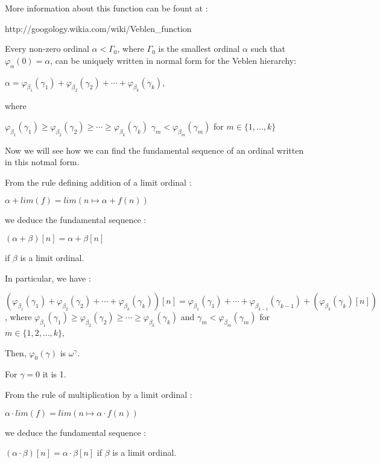 \documentclass[10pt]{article}
\begin{document}
More information about this function can be fount at :

http://googology.wikia.com/wiki/Veblen\_function 

\bigskip

Every non-zero ordinal \(\alpha<\Gamma_0\), where \(\Gamma_0\) is the smallest ordinal \(\alpha\) such that \(\varphi_\alpha(0)=\alpha\), can be uniquely written in normal form for the Veblen hierarchy:

\(\alpha=\varphi_{\beta_1}(\gamma_1) + \varphi_{\beta_2}(\gamma_2) + \cdots + \varphi_{\beta_k}(\gamma_k)\),

where

\(\varphi_{\beta_1}(\gamma_1) \ge \varphi_{\beta_2}(\gamma_2) \ge \cdots \ge \varphi_{\beta_k}(\gamma_k)\)
\(\gamma_m < \varphi_{\beta_m}(\gamma_m)\) for \(m \in \{1,...,k\}\)

\bigskip

Now we will see how we can find the fundamental sequence of an ordinal written in this notmal form.

From the rule defining addition of a limit ordinal :

\( \alpha + lim(f) = lim (n \mapsto \alpha + f(n)) \)

we deduce the fundamental sequence :

\( (\alpha + \beta)[n] = \alpha + \beta[n] \)

if \( \beta \) is a limit ordinal. 

In particular, we have :

\((\varphi_{\beta_1}(\gamma_1) + \varphi_{\beta_2}(\gamma_2) + \cdots + \varphi_{\beta_k}(\gamma_k))[n]=\varphi_{\beta_1}(\gamma_1) + \cdots + \varphi_{\beta_{k-1}}(\gamma_{k-1}) + (\varphi_{\beta_k}(\gamma_k) [n])\), where \(\varphi_{\beta_1}(\gamma_1) \ge \varphi_{\beta_2}(\gamma_2) \ge \cdots \ge \varphi_{\beta_k}(\gamma_k)\) and \(\gamma_m < \varphi_{\beta_m}(\gamma_m)\) for \(m \in \{1,2,...,k\}\),

Then, \( \varphi_0(\gamma) \) is \( \omega^\gamma \).

For \( \gamma = 0 \) it is 1.

From the rule of multiplication by a limit ordinal :

\( \alpha \cdot lim(f) = lim (n \mapsto \alpha \cdot f(n)) \)

we deduce the fundamental sequence :

\( (\alpha \cdot \beta)[n] = \alpha \cdot \beta[n] \)
if \( \beta \) is a limit ordinal.
\end{document}
